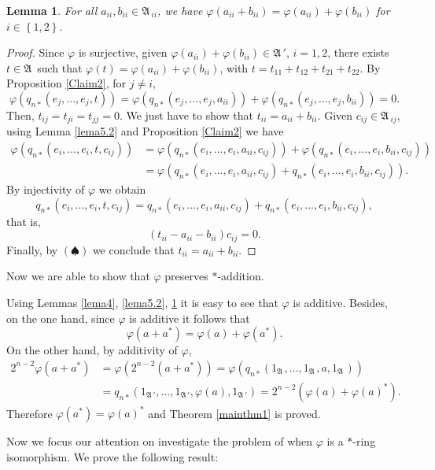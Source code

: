 \documentclass{amsart}
\newtheorem{lemma}{Lemma}[section]
\def\A{{\mathfrak A}\, }
\begin{document}
\begin{lemma}\label{lema6}
For all $a_{ii}, b_{ii} \in \A_{ii}$, we have $\varphi(a_{ii} + b_{ii}) = \varphi(a_{ii}) + \varphi(b_{ii})$ for $i \in \left\{1,2\right\}.$
\end{lemma}
\begin{proof}
Since $\varphi$ is surjective, given $\varphi(a_{ii})+\varphi(b_{ii}) \in \A'$, $i=1,2$, there exists $t \in \A$ such that 
$\varphi(t) = \varphi(a_{ii})+\varphi(b_{ii})$, with $t=t_{11}+t_{12}+t_{21}+t_{22}$. By Proposition \ref{Claim2}, for $j \neq i$,
$$
\varphi(q_{n*}(e_j,...,e_j,t)) = \varphi(q_{n*}(e_j,...,e_j,a_{ii})) + \varphi(q_{n*}(e_j,...,e_j,b_{ii})) = 0.
$$
Then, $t_{ij}=t_{ji}=t_{jj}=0$. We just have to show that $t_{ii} = a_{ii} + b_{ii}$. Given $c_{ij} \in \A_{ij}$, using Lemma \ref{lema5.2} and  
Proposition \ref{Claim2} we have
$$
\begin{aligned}
\varphi(q_{n*}(e_i,...,e_i,t,c_{ij})) &= \varphi(q_{n*}(e_i,...,e_i,a_{ii},c_{ij}))+\varphi(q_{n*}(e_i,...,e_i,b_{ii},c_{ij})) \\
                                      &= \varphi(q_{n*}(e_i,...,e_i,a_{ii},c_{ij}) + q_{n*}(e_i,...,e_i,b_{ii},c_{ij})).
\end{aligned}
$$
By injectivity of $\varphi$ we obtain
$$
q_{n*}(e_i,...,e_i,t,c_{ij}) = q_{n*}(e_i,...,e_i,a_{ii},c_{ij}) + q_{n*}(e_i,...,e_i,b_{ii},c_{ij}),
$$
that is,
$$
(t_{ii} - a_{ii} - b_{ii})c_{ij} = 0.
$$
Finally, by $\left(\spadesuit\right)$ we conclude that $t_{ii} = a_{ii} + b_{ii}$.
\end{proof}

Now we are able to show that $\varphi$ preserves $*$-addition.

Using Lemmas \ref{lema4}, \ref{lema5.2}, \ref{lema6} it is easy to see that $\varphi$ is additive.
Besides, on the one hand, since $\varphi$ is additive it follows that 
$$\varphi(a + a^{*}) = \varphi(a) + \varphi(a^{*}).$$
On the other hand, by additivity of $\varphi$,
$$
\begin{aligned}
2^{n-2}\varphi(a + a^{*}) &= \varphi(2^{n-2}(a + a^{*}))  = \varphi(q_{n*}(1_{\A},...,1_{\A},a,1_{\A})) \\
               &= q_{n*}(1_{\A'},...,1_{\A'},\varphi(a),1_{\A'}) = 2^{n-2}(\varphi(a) + \varphi(a)^{*}).
\end{aligned}
$$
Therefore $\varphi(a^{*}) = \varphi(a)^{*}$ and Theorem \ref{mainthm1} is proved.

\vspace{0,5cm}
Now we focus our attention on investigate the problem of when $\varphi$ is a $*$-ring isomorphism. We prove the following result:
\end{document}
